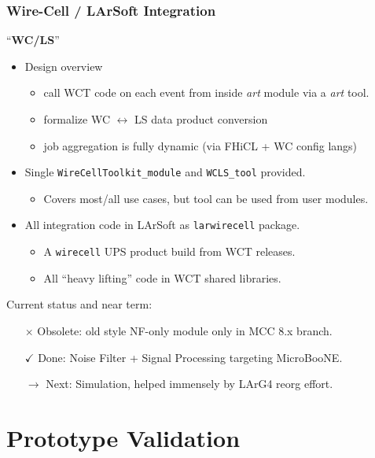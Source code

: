 \documentclass[xcolor=dvipsnames]{beamer}
\begin{document}
\begin{frame}
  \frametitle{\textbf{W}ire-\textbf{C}ell / \textbf{L}Ar\textbf{S}oft Integration}
  ``\textbf{WC/LS}''
  \begin{itemize}\footnotesize
  \item Design overview
    \begin{itemize}\scriptsize
    \item call WCT code on each event from inside \textit{art} module via a \textit{art} tool.
    \item formalize WC $\leftrightarrow$ LS data product conversion
    \item job aggregation is fully dynamic (via FHiCL + WC config langs)
    \end{itemize}
  \item Single \texttt{WireCellToolkit\_module} and \texttt{WCLS\_tool} provided.
    \begin{itemize}\scriptsize
    \item Covers most/all use cases, but tool can be used from user modules.
    \end{itemize}
  \item All integration code in LArSoft as \texttt{larwirecell} package.
    \begin{itemize}\scriptsize
    \item A \texttt{wirecell} UPS product build from WCT releases.
    \item All ``heavy lifting'' code in WCT shared libraries.
    \end{itemize}
  \end{itemize}
  Current status and near term:
  \begin{itemize}\footnotesize
  \item[$\times$] Obsolete: old style NF-only module only in MCC 8.x branch.
  \item[$\checkmark$] Done: Noise Filter + Signal Processing targeting MicroBooNE.
  \item[$\to$] Next: Simulation, helped immensely by LArG4 reorg effort.
  \end{itemize}
\end{frame}

\section{Prototype Validation}
\end{document}
